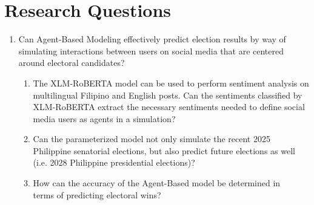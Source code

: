 \section{Research Questions}

\begin{enumerate}
    \item Can Agent-Based Modeling effectively predict election results by way of simulating interactions between users on social media that are centered around electoral candidates?
    \begin{enumerate}
        \item The XLM-RoBERTA model can be used to perform sentiment analysis on multilingual Filipino and English posts. Can the sentiments classified by XLM-RoBERTA extract the necessary sentiments needed to define social media users as agents in a simulation?
        \item Can the parameterized model not only simulate the recent 2025 Philippine senatorial elections, but also predict future elections as well (i.e. 2028 Philippine presidential elections)?
        \item How can the accuracy of the Agent-Based model be determined in\\
        terms of predicting electoral wins?
    \end{enumerate}
\end{enumerate}

% 